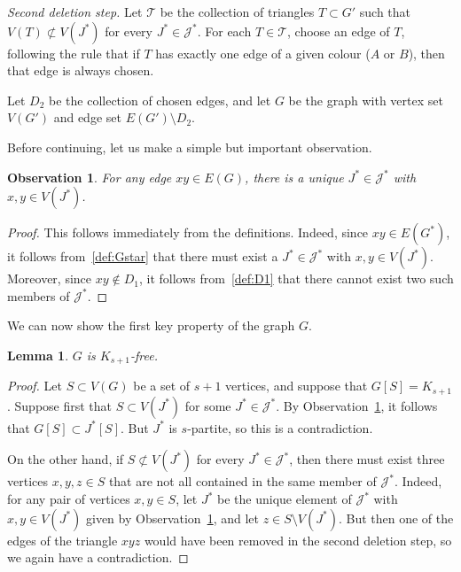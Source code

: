 \documentclass[12pt,reqno]{amsart}
\newtheorem{lemma}[theorem]{Lemma}
\newtheorem{observation}[theorem]{Observation}
\theoremstyle{remark}
\numberwithin{theorem}{section}
\renewcommand{\(}{\bigl(}
\renewcommand{\)}{\bigr)\vphantom{)}}
\newcommand{\cT}{\mathcal T}
\newcommand{\cJ}{\mathcal J}
\begin{document}
\noindent \emph{Second deletion step.} Let $\cT$ be the collection of triangles $T \subset G'$ such that $V(T) \not\subset V(J^*)$ for every $J^* \in \cJ^*$. For each $T \in \cT$, choose an edge of $T$, following the rule that if $T$ has exactly one edge of a given colour ($A$ or $B$), then that edge is always chosen. 

Let $D_2$ be the collection of chosen edges, and let $G$ be the graph with vertex set $V(G')$ and edge set $E(G') \setminus D_2$.\smallskip 

Before continuing, let us make a simple but important observation.

\pagebreak

\begin{observation}\label{obs:unique:Jstar}
For any edge $xy \in E(G)$, there is a unique $J^* \in \cJ^*$ with $x,y \in V(J^*)$.
\end{observation}

\begin{proof}
This follows immediately from the definitions. Indeed, since $xy \in E(G^*)$, it follows from~\eqref{def:Gstar} that there must exist a $J^* \in \cJ^*$ with $x,y \in V(J^*)$. Moreover, since $xy \not\in D_1$, it follows from~\eqref{def:D1} that there cannot exist two such members of $\cJ^*$.
\end{proof}

We can now show the first key property of the graph $G$. 

\begin{lemma}\label{lem:G-Ks+1-free} 
$G$ is $K_{s+1}$-free.
\end{lemma}

\begin{proof}
Let $S \subset V(G)$ be a set of $s+1$ vertices, and suppose that $G[S] = K_{s+1}$. Suppose first that $S \subset V(J^*)$ for some $J^* \in \cJ^*$. By Observation~\ref{obs:unique:Jstar}, 
it follows that $G[S] \subset J^*[S]$. But $J^*$ is $s$-partite, so this is a contradiction. 

On the other hand, if $S \not\subset V(J^*)$ for every $J^* \in \cJ^*$, then there must exist three vertices $x,y,z \in S$ that are not all contained in the same member of $\cJ^*$. Indeed, for any pair of vertices $x,y \in S$, let $J^*$ be the unique element of $\cJ^*$ with $x,y \in V(J^*)$ given by Observation~\ref{obs:unique:Jstar}, and let $z \in S \setminus V(J^*)$. But then one of the edges of the triangle $xyz$ would have been removed in the second deletion step, so we again have a contradiction. 
\end{proof}
\end{document}
